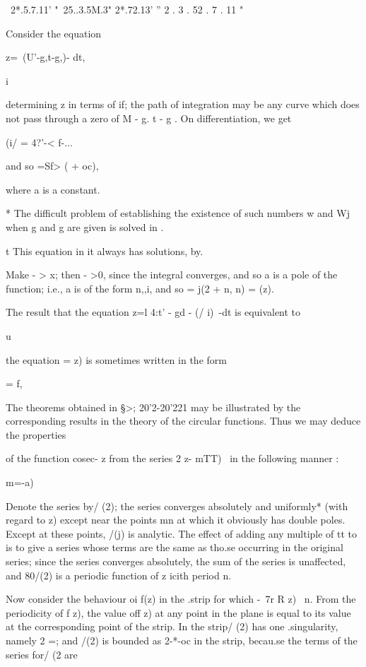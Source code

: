 { ~2*.5.7.11' "~25..3.5M.3" 2*.72.13' '' 2 . 3 . 52 . 7 . 11 "

 Consider the equation

z=\ (U'-g,t-g,)- dt,

  i

determining z in terms of if; the path of integration may be any
curve which does not pass through a zero of M - g. t - g . On
differentiation, we get

(i/ = 4?'-< f-...

and so =Sf> ( + oc),

where a is a constant.

* The difficult problem of establishing the existence of such numbers
w and Wj when g and g are given is solved in .

t This equation in it always has solutions, by.

%
%

Make - > x; then - >0, since the integral converges, and so a is a
pole of the function; i.e., a is of the form n,,i, and so = j(2 + n,
n) = (z).

The result that the equation z=l 4:t' - gd - (/ i)~-dt is equivalent
to

u

the equation = z) is sometimes written in the form

= f,


The theorems obtained in §>; 20'2-20'221 may be illustrated by the
corresponding results in the theory of the circular functions. Thus we
may deduce the properties

of the function cosec- z from the series 2 z- mTT)~ in the following
manner :

m=-a)

Denote the series by/ (2); the series converges absolutely and
uniformly* (with regard to z) except near the points mn at which it
obviously has double poles. Except at these points, /(j) is analytic.
The effect of adding any multiple of tt to is to give a series whose
terms are the same as tho.se occurring in the original series; since
the series converges absolutely, the sum of the series is unaffected,
and 80/(2) is a periodic function of z icith period n.

Now consider the behaviour oi f(z) in the .strip for which -\ 7r R z)
\ n. From the periodicity of f z), the value off z) at any point in
the plane is equal to its value at the corresponding point of the
strip. In the strip/ (2) has one .singularity, namely 2 =; and /(2)
is bounded as 2-*-oc in the strip, becau.se the terms of the series
for/ (2 are

}

